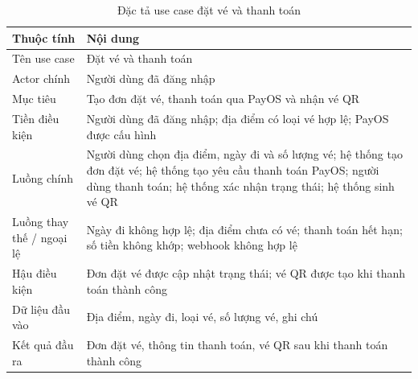 ﻿\documentclass[../DoAn.tex]{subfiles}
\begin{document}
\begin{table}[H]
\centering
\caption{Đặc tả use case đặt vé và thanh toán}
\label{tab:uc-payment}
\small
\renewcommand{\arraystretch}{1.15}
\setlength{\tabcolsep}{4pt}
\begin{tabularx}{\textwidth}{|L{3.4cm}|Y|}
\hline
\textbf{Thuộc tính} & \textbf{Nội dung} \\
\hline
Tên use case & Đặt vé và thanh toán \\
\hline
Actor chính & Người dùng đã đăng nhập \\
\hline
Mục tiêu & Tạo đơn đặt vé, thanh toán qua PayOS và nhận vé QR \\
\hline
Tiền điều kiện & Người dùng đã đăng nhập; địa điểm có loại vé hợp lệ; PayOS được cấu hình \\
\hline
Luồng chính & Người dùng chọn địa điểm, ngày đi và số lượng vé; hệ thống tạo đơn đặt vé; hệ thống tạo yêu cầu thanh toán PayOS; người dùng thanh toán; hệ thống xác nhận trạng thái; hệ thống sinh vé QR \\
\hline
Luồng thay thế / ngoại lệ & Ngày đi không hợp lệ; địa điểm chưa có vé; thanh toán hết hạn; số tiền không khớp; webhook không hợp lệ \\
\hline
Hậu điều kiện & Đơn đặt vé được cập nhật trạng thái; vé QR được tạo khi thanh toán thành công \\
\hline
Dữ liệu đầu vào & Địa điểm, ngày đi, loại vé, số lượng vé, ghi chú \\
\hline
Kết quả đầu ra & Đơn đặt vé, thông tin thanh toán, vé QR sau khi thanh toán thành công \\
\hline
\end{tabularx}
\end{table}
\end{document}
